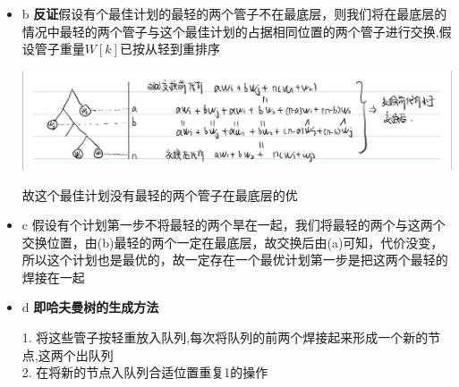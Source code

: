 \documentclass[12pt,a4paper]{article}
\begin{document}
\begin{CJK*}{UTF8}{gbsn}
\begin{itemize}
			\item{b} {\bf 反证}假设有个最佳计划的最轻的两个管子不在最底层，则我们将在最底层的情况中最轻的两个管子与这个最佳计划的占据相同位置的两个管子进行交换,假设管子重量$W[k]$已按从轻到重排序


				\includegraphics[width=15cm]{img/answ3.jpg}

				故这个最佳计划没有最轻的两个管子在最底层的优

			\item{c} 假设有个计划第一步不将最轻的两个旱在一起，我们将最轻的两个与这两个交换位置，由(b)最轻的两个一定在最底层，故交换后由(a)可知，代价没变，所以这个计划也是最优的，故一定存在一个最优计划第一步是把这两个最轻的焊接在一起
			\item{d} {\bf 即哈夫曼树的生成方法}

				1. 将这些管子按轻重放入队列,每次将队列的前两个焊接起来形成一个新的节点,这两个出队列\\
				2. 在将新的节点入队列合适位置重复1的操作

		\end{itemize}


	\end{CJK*}
	
\end{document}
